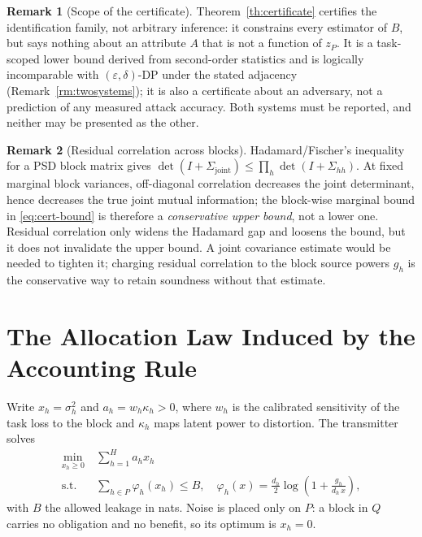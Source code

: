 \documentclass[10pt,twocolumn,letterpaper]{article}
\theoremstyle{plain}
\theoremstyle{definition}
\newtheorem{remark}{Remark}
\begin{document}
\begin{remark}[Scope of the certificate]
\label{rm:scope}
Theorem~\ref{th:certificate} certifies the identification family, not
arbitrary inference: it constrains every estimator of $B$, but says nothing
about an attribute $A$ that is not a function of $z_P$. It is a task-scoped lower bound derived from second-order statistics and is
logically incomparable with $(\varepsilon,\delta)$-DP under the stated
adjacency (Remark~\ref{rm:twosystems}); it is also a certificate about an
adversary, not a prediction of any measured attack accuracy. Both systems must
be reported, and neither may be presented as the other.
\end{remark}

\begin{remark}[Residual correlation across blocks]
\label{rm:corr}
Hadamard/Fischer's inequality for a PSD block matrix gives
$\det(I+\Sigma_{\mathrm{joint}})\le\prod_h\det(I+\Sigma_{hh})$. At fixed
marginal block variances, off-diagonal correlation decreases the joint
determinant, hence decreases the true joint mutual information; the
block-wise marginal bound in \eqref{eq:cert-bound} is therefore a
\emph{conservative upper bound}, not a lower one. Residual correlation only
widens the Hadamard gap and loosens the bound, but it does not invalidate the
upper bound. A joint covariance estimate would be needed to tighten it; charging
residual correlation to the block source powers $g_h$ is the conservative way to
retain soundness without that estimate.
\end{remark}

\section{The Allocation Law Induced by the Accounting Rule}
\label{sec:allocation}

Write $x_h=\sigma_h^{2}$ and $a_h=w_h\kappa_h>0$, where $w_h$ is the
calibrated sensitivity of the task loss to the block and $\kappa_h$ maps
latent power to distortion. The transmitter solves
\begin{equation}\begin{split}
\min_{x_h\ge0}\ &\sum_{h=1}^{H} a_h x_h\\
\text{s.t.}\ &\sum_{h\in P}\varphi_h(x_h)\le B,\quad
\varphi_h(x)=\tfrac{d_h}{2}\log\!\left(1+\frac{g_h}{d_h\,x}\right),
\end{split}\label{eq:primal}
\end{equation}
with $B$ the allowed leakage in nats. Noise is placed only on $P$: a block in
$Q$ carries no obligation and no benefit, so its optimum is $x_h=0$.
\end{document}
